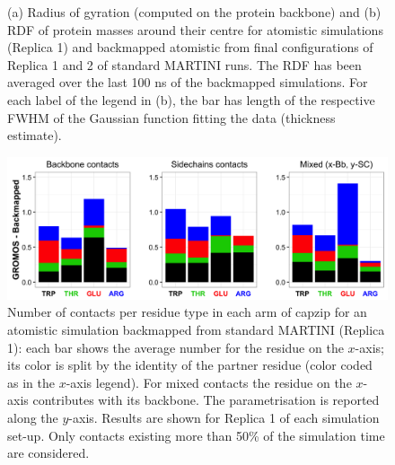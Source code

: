 \begin{figure}[p!]
\centering
{}
\caption[Backmapping simulations: R$_g$ and RDF]{(a) Radius of gyration (computed on the protein backbone) and (b) RDF of protein masses around their centre for atomistic simulations (Replica 1) and backmapped atomistic from final configurations of Replica 1 and 2 of standard MARTINI runs. The RDF has been averaged over the last 100 ns of the backmapped simulations. For each label of the legend in (b), the bar has length of the respective FWHM of the Gaussian function fitting the data (thickness estimate). }
\label{fig:backmap}
\vspace{1.5cm}
\centering
\includegraphics[width=0.95\linewidth]{3results_capsule/pics/contacts_BM.png} 
\caption[Backmapping simulations: contacts]{Number of contacts per residue type in each arm of capzip for an atomistic simulation backmapped from standard MARTINI (Replica 1): each bar shows the average number for the residue on the $x$-axis; its color is split by the identity of the partner residue (color coded as in the $x$-axis legend). For mixed contacts the residue on the $x$-axis contributes with its backbone. The parametrisation is reported along the $y$-axis. Results are shown for Replica 1 of each simulation set-up. Only contacts existing more than 50\% of the simulation time are considered.}
\label{fig:BM_contacts}
\end{figure}

